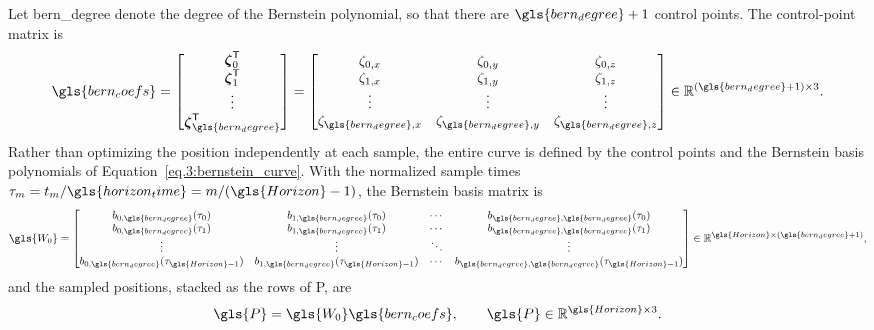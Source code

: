 Let \gls{bern_degree} denote the degree of the Bernstein polynomial, so that there are $\gls{bern_degree}+1$ control points. The control-point matrix is
\begin{equation}
    \gls{bern_coefs} =
    \begin{bmatrix}
        \boldsymbol{\zeta}_0^{\mathsf T}\\
        \boldsymbol{\zeta}_1^{\mathsf T}\\
        \vdots \\
        \boldsymbol{\zeta}_{\gls{bern_degree}}^{\mathsf T}
    \end{bmatrix}
    =
    \begin{bmatrix}
        \zeta_{0,x} & \zeta_{0,y} & \zeta_{0,z} \\
        \zeta_{1,x} & \zeta_{1,y} & \zeta_{1,z} \\
        \vdots & \vdots & \vdots \\
        \zeta_{\gls{bern_degree},x} & \zeta_{\gls{bern_degree},y} & \zeta_{\gls{bern_degree},z}
    \end{bmatrix}
    \in \mathbb{R}^{(\gls{bern_degree}+1)\times 3}.
    \label{eq.6:control_point_matrix}
\end{equation}
Rather than optimizing the position independently at each sample, the entire curve is defined by the control points and the Bernstein basis polynomials of Equation~\eqref{eq.3:bernstein_curve}. With the normalized sample times $\tau_m=t_m/\gls{horizon_time}=m/(\gls{Horizon}-1)$, the Bernstein basis matrix is
\begin{equation}
    \gls{W_0} =
    \begin{bmatrix}
        b_{0,\gls{bern_degree}}(\tau_0) & b_{1,\gls{bern_degree}}(\tau_0) & \cdots & b_{\gls{bern_degree},\gls{bern_degree}}(\tau_0) \\
        b_{0,\gls{bern_degree}}(\tau_1) & b_{1,\gls{bern_degree}}(\tau_1) & \cdots & b_{\gls{bern_degree},\gls{bern_degree}}(\tau_1) \\
        \vdots & \vdots & \ddots & \vdots \\
        b_{0,\gls{bern_degree}}(\tau_{\gls{Horizon}-1}) & b_{1,\gls{bern_degree}}(\tau_{\gls{Horizon}-1}) & \cdots &
        b_{\gls{bern_degree},\gls{bern_degree}}(\tau_{\gls{Horizon}-1})
    \end{bmatrix}
    \in \mathbb{R}^{\gls{Horizon}\times(\gls{bern_degree}+1)},
    \label{eq.6:bernstein_basis_matrix}
\end{equation}
and the sampled positions, stacked as the rows of \gls{P}, are
\begin{equation}
    \gls{P} = \gls{W_0} \gls{bern_coefs},
    \qquad
    \gls{P}\in\mathbb{R}^{\gls{Horizon}\times3}.
    \label{eq.6:sampled_position_trajectory}
\end{equation}

